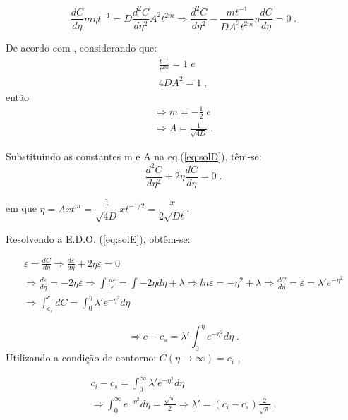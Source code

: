 \documentclass[]{politex}
\begin{document}
\begin{equation} \label{eq:solD}
 \frac{dC}{d\eta}m\eta t^{-1} = D \frac{d^2C}{d\eta ^2}A^2t^{2m} \Rightarrow \frac{d^2C}{d\eta ^2} - \frac{mt^{-1}}{DA^2t^{2m}}\eta \frac{dC}{d\eta} = 0  \; .
\end{equation}

De acordo com \cite{notas-modelos}, considerando que:
\begin{gather*}		
	\frac{t^{-1}}{t^{2m}} = 1  \; e\\
	4DA^2 = 1  \; ,
\end{gather*}	
então
\begin{gather*}		
	\Rightarrow m = -\frac{1}{2} \; e \\ 
	\Rightarrow A = \frac{1}{\sqrt{4D}} \; .
\end{gather*}	


Substituindo as constantes m e A na eq.(\ref{eq:solD}), têm-se:
\begin{equation} \label{eq:solE}
 \frac{d^2C}{d\eta ^2} + 2\eta \frac{dC}{d\eta} = 0 \;.
\end{equation}

em que $\eta = Axt^m = \dfrac{1}{\sqrt{4D}}xt^{-1/2} = \dfrac{x}{2\sqrt{Dt}}$.

Resolvendo a E.D.O. (\ref{eq:solE}), obtêm-se:

\begin{gather*}		
	\varepsilon = \frac{dC}{d\eta} \Rightarrow \frac{d\varepsilon}{d\eta} + 2\eta\varepsilon = 0 \\
	\Rightarrow \frac{d\varepsilon}{d\eta} = -2\eta\varepsilon \Rightarrow \int\frac{d\varepsilon}{\varepsilon} = \int -2\eta d\eta + \lambda \Rightarrow ln\varepsilon = -\eta^2 + \lambda \Rightarrow \frac{dC}{d\eta} = \varepsilon = \lambda'e^{-\eta^2} \\
	\Rightarrow \int_{c_s}^{c} dC = \int_{0}^{\eta} \lambda'e^{-\eta^2} d\eta 
\end{gather*}	

\begin{equation} \label{eq:solF}
	\Rightarrow c - c_s =  \lambda'\int_{0}^{\eta} e^{-\eta^2} d\eta  \;.
\end{equation}
Utilizando a condição de contorno: $C(\eta\rightarrow \infty) = c_i$ ,

\begin{gather*}	
	c_i - c_s = \int_{0}^{\infty} \lambda'e^{-\eta^2} d\eta  \\
	\Rightarrow \int_{0}^{\infty} e^{-\eta^2} d\eta  = \frac{\sqrt{\pi}}{2} \Rightarrow 			\lambda' = (c_i - c_s)\frac{2}{\sqrt{\pi}} \;.
\end{gather*}
\end{document}

